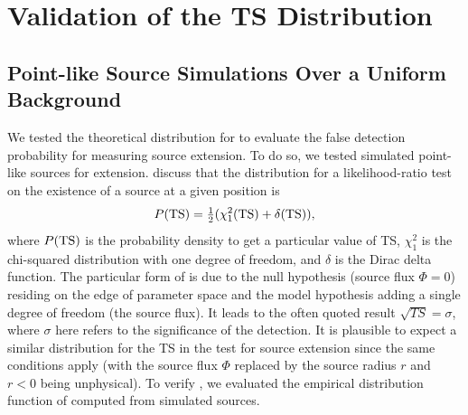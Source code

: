 \section{Validation of the TS Distribution}

\subsection{Point-like Source Simulations Over a Uniform Background}

We tested the theoretical distribution for \tsext
to evaluate the false detection probability for measuring source extension.
To do so, we tested simulated point-like sources for extension. 
\cite{mattox_1996a_likelihood-analysis}
discuss that the \ts distribution for a likelihood-ratio test
on the existence of a source at a given position is
\begin{equation}\eqnlabel{ts_ext_distribution}
  P(\ts)=\tfrac{1}{2}(\chi^2_1(\ts)+\delta(\ts)),
\end{equation}
where $P(\mathrm{TS})$ is the probability density to get a particular value of TS,
$\chi^2_1$ is the chi-squared distribution with one degree of freedom, and
$\delta$ is the Dirac delta function.
The particular form of  is due to the
null hypothesis (source flux $\Phi=0$) residing on the edge of parameter
space and the model hypothesis adding a single degree of freedom (the source flux).
It leads to the often quoted result $\sqrt{TS}=\sigma$, where 
$\sigma$ here refers to the significance of the detection. It is plausible
to expect a similar distribution for the TS in the test for
source extension since the same conditions apply (with the source flux
$\Phi$ replaced by the source radius $r$ and $r<0$ being unphysical).
To verify , we evaluated the
empirical distribution function of \tsext computed from simulated sources.

